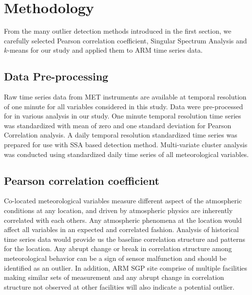 \section{Methodology}
From the many outlier detection methods introduced in the first section,
we carefully selected Pearson correlation coefficient, Singular
Spectrum Analysis and $k$-means for our study and applied them to ARM
time series data. 

\subsection{Data Pre-processing}
Raw time series data from MET instruments are available at temporal
resolution of one minute for all variables considered in this study.
Data were pre-processed for in various analysis in our study. One minute
temporal resolution time series was standardized with mean of zero and
one standard deviation for Pearson Correlation analysis. A daily
temporal resolution standardized time series was prepared for use with
SSA based detection method. Multi-variate cluster analysis was conducted
using standardized daily time series of all meteorological variables.


\subsection{Pearson correlation coefficient}
Co-located meteorological variables measure different aspect of the
atmospheric conditions at any location, and driven by atmospheric physics
are inherently correlated with each others. Any atmospheric phenomena at
the location would affect all variables in an expected
and correlated fashion.  Analysis of historical time
series data would provide us the baseline correlation structure and
patterns for the location. Any abrupt change or break in
correlation structure among meteorological behavior can be a sign of
sensor malfunction and should be identified as an outlier. In addition,
ARM SGP site comprise of multiple facilities making similar sets of
measurement and any abrupt change in correlation structure not observed
at other facilities will also indicate a potential outlier.

